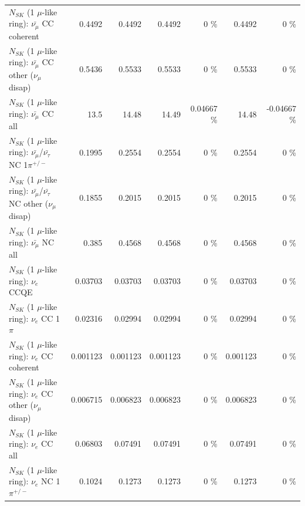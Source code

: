\begin{table}
\begin{tabular}{| l | r | r | r  r | r  r |}
                       $N_{SK}$ (1 $\mu$-like ring): $\bar{\nu_\mu}$ CC coherent &          0.4492 &          0.4492 &          0.4492 &        0 \%  &          0.4492 &        0 \%  \\ 
        $N_{SK}$ (1 $\mu$-like ring): $\bar{\nu_\mu}$ CC other ($\nu_\mu$ disap) &          0.5436 &          0.5533 &          0.5533 &        0 \%  &          0.5533 &        0 \%  \\ 
                          $N_{SK}$ (1 $\mu$-like ring): $\bar{\nu_{\mu}}$ CC all &            13.5 &           14.48 &           14.49 &  0.04667 \%  &           14.48 & -0.04667 \%  \\ 
\hline
  $N_{SK}$ (1 $\mu$-like ring): $\bar{\nu_\mu}$/$\bar{\nu_\tau}$ NC 1$\pi^{+/-}$ &          0.1995 &          0.2554 &          0.2554 &        0 \%  &          0.2554 &        0 \%  \\ 
$N_{SK}$ (1 $\mu$-like ring): $\bar{\nu_\mu}$/$\bar{\nu_\tau}$ NC other ($\nu_\mu$ disap) &          0.1855 &          0.2015 &          0.2015 &        0 \%  &          0.2015 &        0 \%  \\ 
                          $N_{SK}$ (1 $\mu$-like ring): $\bar{\nu_{\mu}}$ NC all &           0.385 &          0.4568 &          0.4568 &        0 \%  &          0.4568 &        0 \%  \\ 
\hline
\hline
\hline
                                      $N_{SK}$ (1 $\mu$-like ring): $\nu_e$ CCQE &         0.03703 &         0.03703 &         0.03703 &        0 \%  &         0.03703 &        0 \%  \\ 
                                 $N_{SK}$ (1 $\mu$-like ring): $\nu_e$ CC 1$\pi$ &         0.02316 &         0.02994 &         0.02994 &        0 \%  &         0.02994 &        0 \%  \\ 
                               $N_{SK}$ (1 $\mu$-like ring): $\nu_e$ CC coherent &        0.001123 &        0.001123 &        0.001123 &        0 \%  &        0.001123 &        0 \%  \\ 
                $N_{SK}$ (1 $\mu$-like ring): $\nu_e$ CC other ($\nu_\mu$ disap) &        0.006715 &        0.006823 &        0.006823 &        0 \%  &        0.006823 &        0 \%  \\ 
                                  $N_{SK}$ (1 $\mu$-like ring): $\nu_{e}$ CC all &         0.06803 &         0.07491 &         0.07491 &        0 \%  &         0.07491 &        0 \%  \\ 
\hline
                           $N_{SK}$ (1 $\mu$-like ring): $\nu_e$ NC 1$\pi^{+/-}$ &          0.1024 &          0.1273 &          0.1273 &        0 \%  &          0.1273 &        0 \%  \\ 

\end{tabular}
\end{table}
